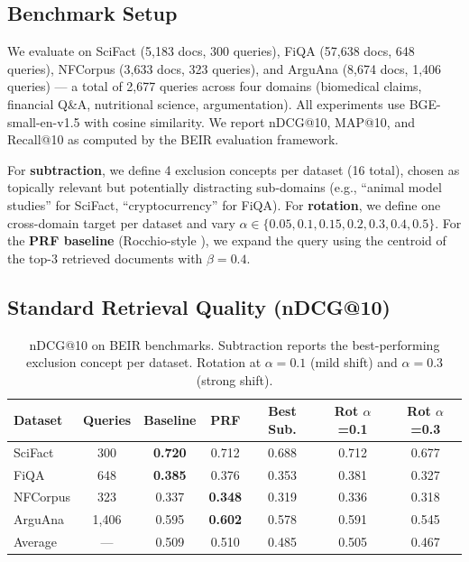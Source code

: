 \documentclass{article}
\begin{document}
\subsection{Benchmark Setup}

We evaluate on SciFact (5,183 docs, 300 queries), FiQA (57,638 docs, 648 queries), NFCorpus (3,633 docs, 323 queries), and ArguAna (8,674 docs, 1,406 queries) --- a total of 2,677 queries across four domains (biomedical claims, financial Q\&A, nutritional science, argumentation). All experiments use BGE-small-en-v1.5 with cosine similarity. We report nDCG@10, MAP@10, and Recall@10 as computed by the BEIR evaluation framework.

For \textbf{subtraction}, we define 4 exclusion concepts per dataset (16 total), chosen as topically relevant but potentially distracting sub-domains (e.g., ``animal model studies'' for SciFact, ``cryptocurrency'' for FiQA). For \textbf{rotation}, we define one cross-domain target per dataset and vary $\alpha \in \{0.05, 0.1, 0.15, 0.2, 0.3, 0.4, 0.5\}$. For the \textbf{PRF baseline} (Rocchio-style \cite{rocchio1971}), we expand the query using the centroid of the top-3 retrieved documents with $\beta = 0.4$.

\subsection{Standard Retrieval Quality (nDCG@10)}

\begin{table}[ht]
\centering
\caption{nDCG@10 on BEIR benchmarks. Subtraction reports the best-performing exclusion concept per dataset. Rotation at $\alpha = 0.1$ (mild shift) and $\alpha = 0.3$ (strong shift).}
\label{tab:beir_ndcg}
\begin{tabular}{lcccccc}
\toprule
Dataset & Queries & Baseline & PRF & Best Sub. & Rot $\alpha$=0.1 & Rot $\alpha$=0.3 \\
\midrule
SciFact   & 300   & \textbf{0.720} & 0.712 & 0.688 & 0.712 & 0.677 \\
FiQA      & 648   & \textbf{0.385} & 0.376 & 0.353 & 0.381 & 0.327 \\
NFCorpus  & 323   & 0.337 & \textbf{0.348} & 0.319 & 0.336 & 0.318 \\
ArguAna   & 1,406 & 0.595 & \textbf{0.602} & 0.578 & 0.591 & 0.545 \\
\midrule
Average   & ---   & 0.509 & 0.510 & 0.485 & 0.505 & 0.467 \\
\bottomrule
\end{tabular}
\end{table}
\end{document}
